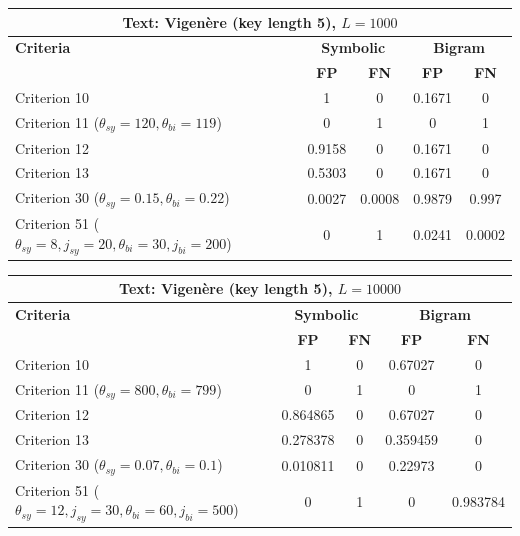 \begin{center}
\renewcommand{\arraystretch}{1.2}
\setlength{\tabcolsep}{6pt}
\begin{tabular}{|l||c|c||c|c|}
\hline
\multicolumn{5}{|c|}{\textbf{Text: Vigenère (key length 5), $L=1000$}} \\
\hline
\textbf{Criteria} & \multicolumn{2}{c||}{\textbf{Symbolic}} & \multicolumn{2}{c|}{\textbf{Bigram}} \\
\hline
 & \textbf{FP} & \textbf{FN} & \textbf{FP} & \textbf{FN} \\
\hline
Criterion 10 & 1 & 0 & 0.1671 & 0 \\
Criterion 11 ($\theta_{sy}=120, \theta_{bi}=119$) & 0 & 1 & 0 & 1 \\
Criterion 12 & 0.9158 & 0 & 0.1671 & 0 \\
Criterion 13 & 0.5303 & 0 & 0.1671 & 0 \\
Criterion 30 ($\theta_{sy}=0.15, \theta_{bi}=0.22$) & 0.0027 & 0.0008 & 0.9879 & 0.997 \\
Criterion 51 ($\theta_{sy}=8, j_{sy}=20, \theta_{bi}=30, j_{bi}=200$) & 0 & 1 & 0.0241 & 0.0002 \\
\hline
\end{tabular}
\end{center}

\begin{center}
\renewcommand{\arraystretch}{1.2}
\setlength{\tabcolsep}{6pt}
\begin{tabular}{|l||c|c||c|c|}
\hline
\multicolumn{5}{|c|}{\textbf{Text: Vigenère (key length 5), $L=10000$}} \\
\hline
\textbf{Criteria} & \multicolumn{2}{c||}{\textbf{Symbolic}} & \multicolumn{2}{c|}{\textbf{Bigram}} \\
\hline
 & \textbf{FP} & \textbf{FN} & \textbf{FP} & \textbf{FN} \\
\hline
Criterion 10 & 1 & 0 & 0.67027 & 0 \\
Criterion 11 ($\theta_{sy}=800, \theta_{bi}=799$) & 0 & 1 & 0 & 1 \\
Criterion 12 & 0.864865 & 0 & 0.67027 & 0 \\
Criterion 13 & 0.278378 & 0 & 0.359459 & 0 \\
Criterion 30 ($\theta_{sy}=0.07, \theta_{bi}=0.1$) & 0.010811 & 0 & 0.22973 & 0 \\
Criterion 51 ($\theta_{sy}=12, j_{sy}=30, \theta_{bi}=60, j_{bi}=500$) & 0 & 1 & 0 & 0.983784 \\
\hline
\end{tabular}
\end{center}


